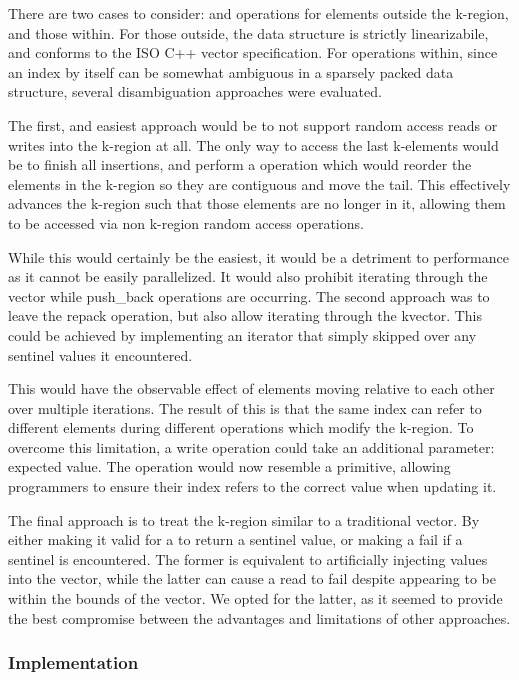 \documentclass{sigplanconf}
\begin{document}
There are two cases to consider:  and  operations for elements outside the k-region, and those within. For those outside, the data structure is strictly linearizabile, and conforms to the ISO C++ vector specification. For operations within, since an index by itself can be somewhat ambiguous in
a sparsely packed data structure, several disambiguation approaches were evaluated.

The first, and easiest approach would be to not support random access
reads or writes into the k-region at all. The only way to access the
last k-elements would be to finish all insertions, and perform a 
operation which would reorder the elements in the k-region so they
are contiguous and move the tail. This effectively advances the k-region such that those elements are no longer in it, allowing them to be accessed via non k-region random access operations.

While this would certainly be the easiest, it would be a detriment
to performance as it cannot be easily parallelized. It would also
prohibit iterating through the vector while push\_back operations
are occurring. The second approach was to leave the repack operation,
but also allow iterating through the kvector. This could be achieved
by implementing an iterator that simply skipped over any sentinel
values it encountered.

This would have the observable effect of elements moving relative to each other over multiple iterations. The result of this is that the same index can refer to different elements during different operations which modify the k-region. To overcome this limitation, a write operation could take an additional parameter: expected value. The operation would now resemble a  primitive, allowing programmers to ensure their index refers to the correct value when updating it.

The final approach is to treat the k-region similar to a traditional vector. By either making it valid for a  to return a sentinel value, or making a  fail if a sentinel is encountered. The former is equivalent to artificially injecting values into the vector, while the latter can cause a read to fail despite appearing to be within the bounds of the vector. We opted for the latter, as it seemed to provide the best compromise between the advantages and limitations of other approaches.

\subsubsection{Implementation}
\end{document}
